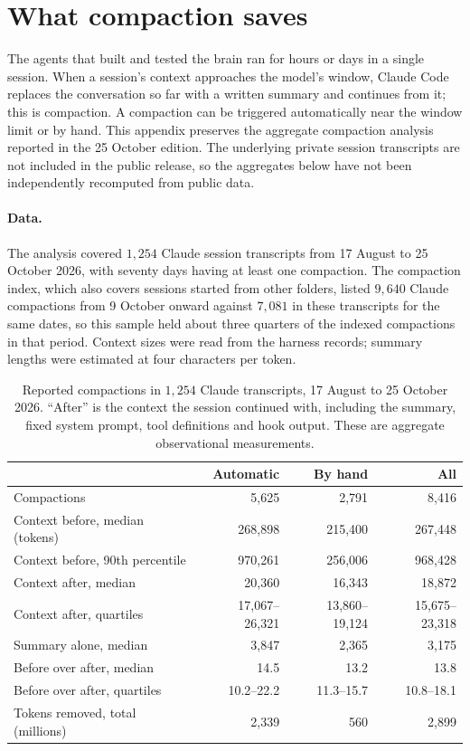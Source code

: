 \section{What compaction saves}\label{app:compaction}
The agents that built and tested the brain ran for hours or days in a single session. When a session's context approaches the model's window, Claude Code replaces the conversation so far with a written summary and continues from it; this is compaction. A compaction can be triggered automatically near the window limit or by hand. This appendix preserves the aggregate compaction analysis reported in the 25 October edition. The underlying private session transcripts are not included in the public release, so the aggregates below have not been independently recomputed from public data.

\paragraph{Data.}
The analysis covered $1{,}254$ Claude session transcripts from 17 August to 25 October 2026, with seventy days having at least one compaction. The compaction index, which also covers sessions started from other folders, listed $9{,}640$ Claude compactions from 9 October onward against $7{,}081$ in these transcripts for the same dates, so this sample held about three quarters of the indexed compactions in that period. Context sizes were read from the harness records; summary lengths were estimated at four characters per token.

\begin{table}[ht]
\centering\small
\begin{tabular}{lrrr}
\toprule
 & Automatic & By hand & All\\
\midrule
Compactions & 5{,}625 & 2{,}791 & 8{,}416\\
Context before, median (tokens) & 268{,}898 & 215{,}400 & 267{,}448\\
Context before, 90th percentile & 970{,}261 & 256{,}006 & 968{,}428\\
Context after, median & 20{,}360 & 16{,}343 & 18{,}872\\
Context after, quartiles & 17{,}067--26{,}321 & 13{,}860--19{,}124 & 15{,}675--23{,}318\\
Summary alone, median & 3{,}847 & 2{,}365 & 3{,}175\\
Before over after, median & 14.5 & 13.2 & 13.8\\
Before over after, quartiles & 10.2--22.2 & 11.3--15.7 & 10.8--18.1\\
Tokens removed, total (millions) & 2{,}339 & 560 & 2{,}899\\
\bottomrule
\end{tabular}
\caption{Reported compactions in $1{,}254$ Claude transcripts, 17 August to 25 October 2026. ``After'' is the context the session continued with, including the summary, fixed system prompt, tool definitions and hook output. These are aggregate observational measurements.}
\label{tab:compaction}
\end{table}

